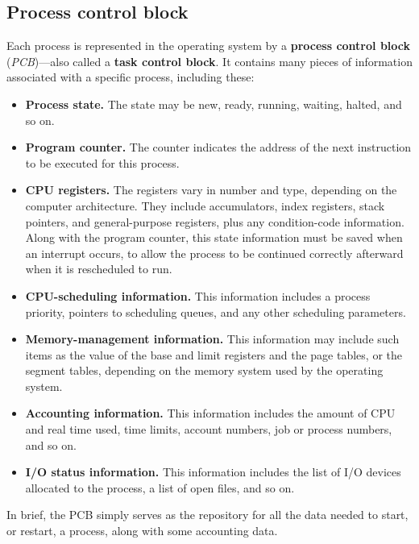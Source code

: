 \subsection*{Process control block}
Each process is represented in the operating system by a \textbf{process control block} (\textit{PCB})---also called a \textbf{task control block}. It contains many pieces of information associated with a specific process, including these:
\begin{itemize}
    \item \textbf{Process state.} The state may be new, ready, running, waiting, halted, and so on.
    \item \textbf{Program counter.} The counter indicates the address of the next instruction to be executed for this process.
    \item \textbf{CPU registers.} The registers vary in number and type, depending on the computer architecture. They include accumulators, index registers, stack pointers, and general-purpose registers, plus any condition-code information. Along with the program counter, this state information must be saved when an interrupt occurs, to allow the process to be continued correctly afterward when it is rescheduled to run.
    \item \textbf{CPU-scheduling information.} This information includes a process priority, pointers to scheduling queues, and any other scheduling parameters.
    \item \textbf{Memory-management information.} This information may include such items as the value of the base and limit registers and the page tables, or the segment tables, depending on the memory system used by the operating system.
    \item \textbf{Accounting information.} This information includes the amount of CPU and real time used, time limits, account numbers, job or process numbers, and so on.
    \item \textbf{I/O status information.} This information includes the list of I/O devices allocated to the process, a list of open files, and so on.
\end{itemize}
In brief, the PCB simply serves as the repository for all the data needed to start, or restart, a process, along with some accounting data.

